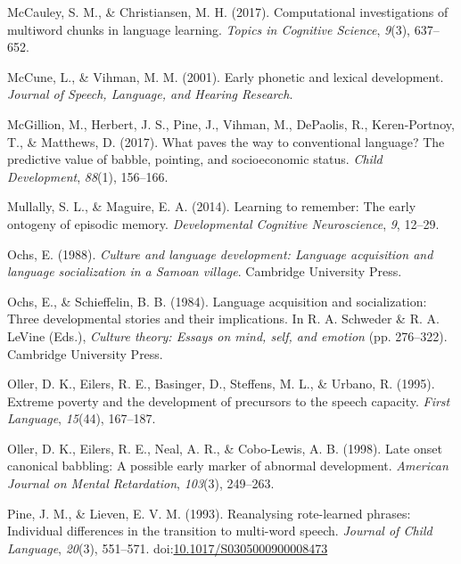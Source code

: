 \documentclass[,man,floatsintext]{apa6}
\begin{document}
\hypertarget{ref-mccauley2017computational}{}
McCauley, S. M., \& Christiansen, M. H. (2017). Computational
investigations of multiword chunks in language learning. \emph{Topics in
Cognitive Science}, \emph{9}(3), 637--652.

\hypertarget{ref-mccune2001early}{}
McCune, L., \& Vihman, M. M. (2001). Early phonetic and lexical
development. \emph{Journal of Speech, Language, and Hearing Research}.

\hypertarget{ref-mcgillion2017paves}{}
McGillion, M., Herbert, J. S., Pine, J., Vihman, M., DePaolis, R.,
Keren-Portnoy, T., \& Matthews, D. (2017). What paves the way to
conventional language? The predictive value of babble, pointing, and
socioeconomic status. \emph{Child Development}, \emph{88}(1), 156--166.

\hypertarget{ref-mullally2014learning}{}
Mullally, S. L., \& Maguire, E. A. (2014). Learning to remember: The
early ontogeny of episodic memory. \emph{Developmental Cognitive
Neuroscience}, \emph{9}, 12--29.

\hypertarget{ref-ochs1988culture}{}
Ochs, E. (1988). \emph{Culture and language development: Language
acquisition and language socialization in a Samoan village}. Cambridge
University Press.

\hypertarget{ref-ochs1984language}{}
Ochs, E., \& Schieffelin, B. B. (1984). Language acquisition and
socialization: Three developmental stories and their implications. In R.
A. Schweder \& R. A. LeVine (Eds.), \emph{Culture theory: Essays on
mind, self, and emotion} (pp. 276--322). Cambridge University Press.

\hypertarget{ref-oller1995extreme}{}
Oller, D. K., Eilers, R. E., Basinger, D., Steffens, M. L., \& Urbano,
R. (1995). Extreme poverty and the development of precursors to the
speech capacity. \emph{First Language}, \emph{15}(44), 167--187.

\hypertarget{ref-oller1998late}{}
Oller, D. K., Eilers, R. E., Neal, A. R., \& Cobo-Lewis, A. B. (1998).
Late onset canonical babbling: A possible early marker of abnormal
development. \emph{American Journal on Mental Retardation},
\emph{103}(3), 249--263.

\hypertarget{ref-pine1993reanalysing}{}
Pine, J. M., \& Lieven, E. V. M. (1993). Reanalysing rote-learned
phrases: Individual differences in the transition to multi-word speech.
\emph{Journal of Child Language}, \emph{20}(3), 551--571.
doi:\href{https://doi.org/10.1017/S0305000900008473}{10.1017/S0305000900008473}
\end{document}
